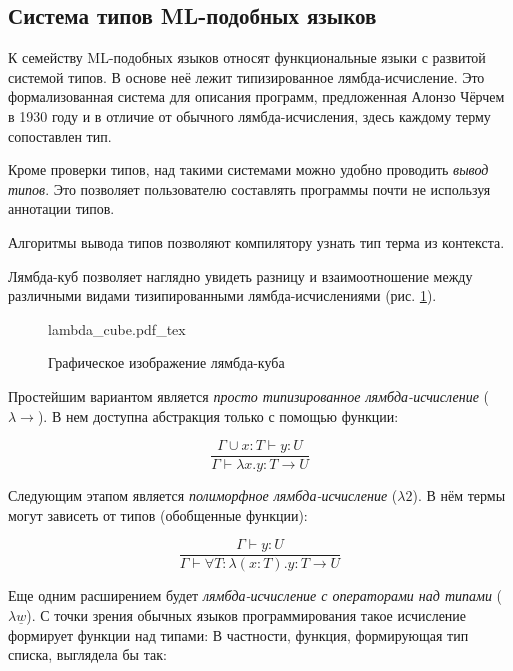 \subsection{Система типов ML-подобных языков}
\label{subsec:ml_type_system}


К семейству ML-подобных языков относят функциональные языки с развитой системой типов.
В основе неё лежит типизированное лямбда-исчисление.
Это формализованная система для описания программ, предложенная Алонзо Чёрчем в 1930 году и в отличие от обычного лямбда-исчисления, здесь каждому терму сопоставлен тип.

Кроме проверки типов, над такими системами можно удобно проводить \textit{вывод типов}.
Это позволяет пользователю составлять программы почти не используя аннотации типов.

Алгоритмы вывода типов позволяют компилятору узнать тип терма из контекста.


Лямбда-куб позволяет наглядно увидеть разницу и взаимоотношение между различными видами тизипированными лямбда-исчислениями (рис. \ref{fig:lambda_cube}).

\begin{figure}[H]
    \centering
    {lambda_cube.pdf_tex}
    \caption{Графическое изображение лямбда-куба}
    \label{fig:lambda_cube}
\end{figure}

Простейшим вариантом является \textit{просто типизированное лямбда-исчисление} ($\lambda \to$).
В нем доступна абстракция только с помощью функции:

\begin{equation}
    \label{eq:STLC}
    \frac{\Gamma \cup x: T \vdash y: U}{\Gamma \vdash \lambda x.y: T \to U}
\end{equation}

Следующим этапом является \textit{полиморфное лямбда-исчисление} ($\lambda 2$).
В нём термы могут зависеть от типов (обобщенные функции):

\begin{equation}
    \label{eq:2TLC}
    \frac{\Gamma \vdash y: U}{\Gamma \vdash \forall T: \lambda (x: T).y: T \to U}
\end{equation}

Еще одним расширением будет \textit{лямбда-исчисление с операторами над типами} ($\lambda \underline{w}$).
С точки зрения обычных языков программирования такое исчисление формирует функции над типами:
В частности, функция, формирующая тип списка, выглядела бы так:

